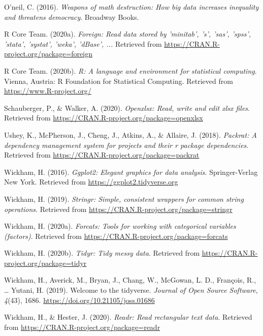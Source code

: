 \documentclass[
  english,
  man]{apa6}
\begin{document}
\leavevmode\hypertarget{ref-oneil_weapons}{}%
O'neil, C. (2016). \emph{Weapons of math destruction: How big data increases inequality and threatens democracy}. Broadway Books.

\leavevmode\hypertarget{ref-R-foreign}{}%
R Core Team. (2020a). \emph{Foreign: Read data stored by 'minitab', 's', 'sas', 'spss', 'stata', 'systat', 'weka', 'dBase', ...} Retrieved from \url{https://CRAN.R-project.org/package=foreign}

\leavevmode\hypertarget{ref-R-base}{}%
R Core Team. (2020b). \emph{R: A language and environment for statistical computing}. Vienna, Austria: R Foundation for Statistical Computing. Retrieved from \url{https://www.R-project.org/}

\leavevmode\hypertarget{ref-R-openxlsx}{}%
Schauberger, P., \& Walker, A. (2020). \emph{Openxlsx: Read, write and edit xlsx files}. Retrieved from \url{https://CRAN.R-project.org/package=openxlsx}

\leavevmode\hypertarget{ref-R-packrat}{}%
Ushey, K., McPherson, J., Cheng, J., Atkins, A., \& Allaire, J. (2018). \emph{Packrat: A dependency management system for projects and their r package dependencies}. Retrieved from \url{https://CRAN.R-project.org/package=packrat}

\leavevmode\hypertarget{ref-R-ggplot2}{}%
Wickham, H. (2016). \emph{Ggplot2: Elegant graphics for data analysis}. Springer-Verlag New York. Retrieved from \url{https://ggplot2.tidyverse.org}

\leavevmode\hypertarget{ref-R-stringr}{}%
Wickham, H. (2019). \emph{Stringr: Simple, consistent wrappers for common string operations}. Retrieved from \url{https://CRAN.R-project.org/package=stringr}

\leavevmode\hypertarget{ref-R-forcats}{}%
Wickham, H. (2020a). \emph{Forcats: Tools for working with categorical variables (factors)}. Retrieved from \url{https://CRAN.R-project.org/package=forcats}

\leavevmode\hypertarget{ref-R-tidyr}{}%
Wickham, H. (2020b). \emph{Tidyr: Tidy messy data}. Retrieved from \url{https://CRAN.R-project.org/package=tidyr}

\leavevmode\hypertarget{ref-R-tidyverse}{}%
Wickham, H., Averick, M., Bryan, J., Chang, W., McGowan, L. D., François, R., \ldots{} Yutani, H. (2019). Welcome to the tidyverse. \emph{Journal of Open Source Software}, \emph{4}(43), 1686. \url{https://doi.org/10.21105/joss.01686}

\leavevmode\hypertarget{ref-R-readr}{}%
Wickham, H., \& Hester, J. (2020). \emph{Readr: Read rectangular text data}. Retrieved from \url{https://CRAN.R-project.org/package=readr}

\endgroup
\end{document}

